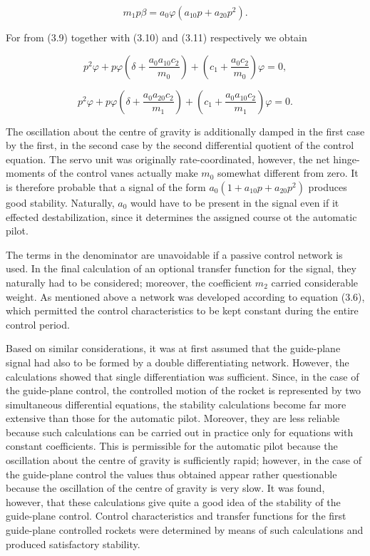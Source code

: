 \documentclass[12pt, a4paper]{article}
\begin{document}
\begin{equation}
  m_{1}p\beta=a_{0}\varphi(a_{10}p+a_{20}p^{2}).
\end{equation}

For from (3.9) together with (3.10) and (3.11) respectively we obtain

\begin{equation}
  p^{2}\varphi+p\varphi\left(\delta+\frac{a_{0}a_{10}c_{2}}{m_{0}}\right)+\left(c_{1}+\frac{a_{0}c_{2}}{m_{0}}\right)\varphi=0,
\end{equation}

\begin{equation}
  p^{2}\varphi+p\varphi\left(\delta+\frac{a_{0}a_{20}c_{2}}{m_{1}}\right)+\left(c_{1}+\frac{a_{0}a_{10}c_{2}}{m_{1}}\right)\varphi=0.
\end{equation}

The oscillation about the centre of gravity is additionally damped in the first case by the first, in the second case by the second differential quotient of the control equation. The servo unit was originally rate-coordinated, however, the net hinge-moments of the control vanes actually make $m_{0}$ somewhat different from zero. It is therefore probable that a signal of the form $a_{0}(1+a_{10}p+a_{20}p^{2})$ produces good stability. Naturally, $a_{0}$ would have to be present in the signal even if it effected destabilization, since it determines the assigned course ot the automatic pilot.

The terms in the denominator are unavoidable if a passive control network is used. In the final calculation of an optional transfer function for the signal, they naturally had to be considered; moreover, the coefficient $m_{2}$ carried considerable weight. As mentioned above a network was developed according to equation (3.6), which permitted the control characteristics to be kept constant during the entire control period.

Based on similar considerations, it was at first assumed that the guide-plane signal had also to be formed by a double differentiating network. However, the calculations showed that single differentiation was sufficient. Since, in the case of the guide-plane control, the controlled motion of the rocket is represented by two simultaneous differential equations, the stability calculations become far more extensive than those for the automatic pilot. Moreover, they are less reliable because such calculations can be carried out in practice only for equations with constant coefficients. This is permissible for the automatic pilot because the oscillation about the centre of gravity is sufficiently rapid; however, in the case of the guide-plane control the values thus obtained appear rather questionable because the oscillation of the centre of gravity is very slow. It was found, however, that these calculations give quite a good idea of the stability of the guide-plane control. Control characteristics and transfer functions for the first guide-plane controlled rockets were determined by means of such calculations and produced satisfactory stability.
\end{document}
